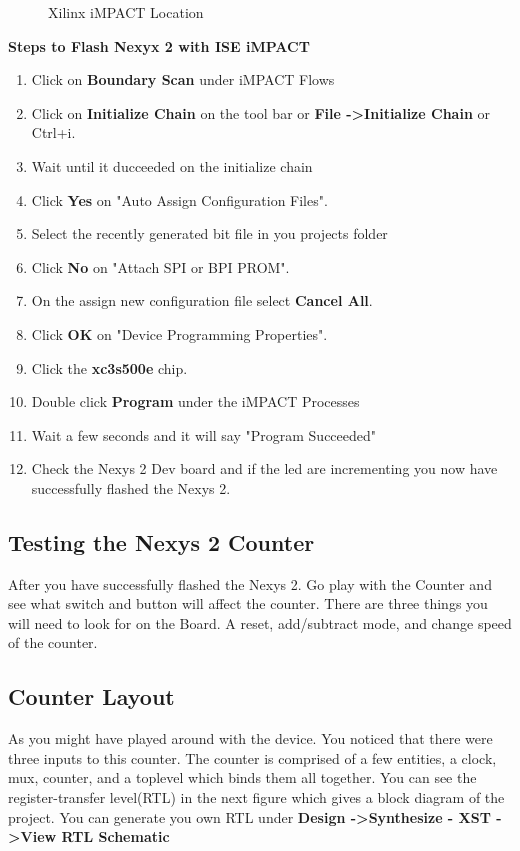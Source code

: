 \documentclass{article}
\begin{document}
\begin{figure}[!htb]
  \centering
  \caption{Xilinx iMPACT Location}
\end{figure}

\textbf{Steps to Flash Nexyx 2 with ISE iMPACT}
\begin{enumerate}
  \item Click on \textbf{Boundary Scan} under iMPACT Flows\
  \item Click on \textbf{Initialize Chain} on the tool bar or \textbf{File -\textgreater Initialize Chain} or Ctrl+i.
  \item Wait until it ducceeded on the initialize chain
  \item Click \textbf{Yes} on "Auto Assign Configuration Files".
  \item Select the recently generated bit file in you projects folder
  \item Click \textbf{No} on "Attach SPI or BPI PROM".
  \item On the assign new configuration file select \textbf{Cancel All}.
  \item Click \textbf{OK} on "Device Programming Properties".
  \item Click the \textbf{xc3s500e} chip.
  \item Double click \textbf{Program} under the iMPACT Processes
  \item Wait a few seconds and it will say "Program Succeeded"
  \item Check the Nexys 2 Dev board and if the led are incrementing you now have successfully flashed the Nexys 2.
\end{enumerate}

\subsection{Testing the Nexys 2 Counter}
After you have successfully flashed the Nexys 2. Go play with the Counter and see what switch and button will affect the counter. There are three things you will need to look for on the Board. A reset, add/subtract mode, and change speed of the counter.

\subsection{Counter Layout}
As you might have played around with the device. You noticed that there were three inputs to this counter. The counter is comprised of a few entities, a clock, mux, counter, and a toplevel which binds them all together. You can see the register-transfer level(RTL) in the next figure which gives a block diagram of the project. You can generate you own RTL under \textbf{Design -\textgreater Synthesize - XST -\textgreater View RTL Schematic}
\end{document}

